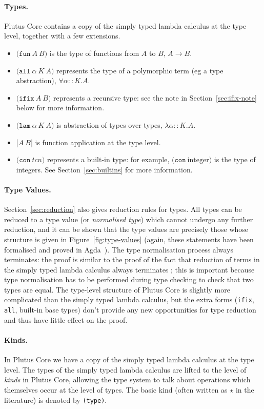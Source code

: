 \documentclass[a4paper]{article}
\newcommand{\keyword}[1]{\texttt{#1}}
\newcommand{\construct}[1]{\texttt{(} #1 \texttt{)}}
\newcommand{\funT}[2]{\construct{\keyword{fun} ~ #1 ~ #2}}
\newcommand{\ifixT}[2]{\construct{\keyword{ifix} ~ #1 ~ #2}}
\newcommand{\fixT}{\ifixT}
\newcommand{\allT}[3]{\construct{\keyword{all} ~ #1 ~ #2 ~ #3}}
\newcommand{\conT}[1]{\construct{\keyword{con} ~ #1}}
\newcommand{\lamT}[3]{\construct{\keyword{lam} ~ #1 ~ #2 ~ #3}}
\newcommand{\appT}[2]{\texttt{[} #1 ~ #2 \texttt{]}}
\begin{document}
\paragraph{Types.} Plutus Core contains a copy of the simply typed lambda calculus
  at the type level, together with a few extensions.
\begin{itemize}
\item $\funT{A}{B}$ is the type of functions from $A$ to $B$, $A \rightarrow B$.
\item $\allT{\alpha}{K}{A}$ represents the type of a polymorphic term (eg a type abstraction), $\forall \alpha{::}K.A$.
\item $\fixT{A}{B}$ represents a recursive type: see the note in Section~\ref{sec:ifix-note} below for more information.
\item $\lamT{\alpha}{K}{A}$ is abstraction of types over types, $\lambda \alpha{::}K.A$.
\item $\appT{A}{B}$ is function application at the type level.
\item $\conT{tcn}$ represents a built-in type: for example, $\conT{\textrm{integer}}$
is the type of integers.  See Section~\ref{sec:builtins} for more information.
\end{itemize}


\paragraph{Type Values.} Section~\ref{sec:reduction} also gives
reduction rules for types.  All types can be reduced to a type value
(or \textit{normalised type}) which cannot undergo any further
reduction, and it can be shown that the type values are precisely
those whose structure is given in Figure~\ref{fig:type-values} (again,
these statements have been formalised and proved in
Agda~\citep{Agda}).  The type normalisation process always terminates:
the proof is similar to the proof of the fact that reduction of terms
in the simply typed lambda calculus always
terminates \citep[\S12]{Pierce:TAPL}; this is important because type
normalisation has to be performed during type checking to check that
two types are equal. The type-level structure of Plutus Core is
slightly more complicated than the simply typed lambda calculus, but
the extra forms (\texttt{ifix}, \texttt{all}, built-in base types)
don't provide any new opportunities for type reduction and thus have
little effect on the proof.

\paragraph{Kinds.} In Plutus Core we have a copy of the
simply typed lambda calculus at the type level. The types of the
simply typed lambda calculus are lifted to the level of
\textit{kinds} in Plutus Core, allowing the type system to talk about
operations which themselves occur at the level of types.  The basic
kind (often written as $\star$ in the literature) is denoted
by \texttt{(type)}.
\end{document}
